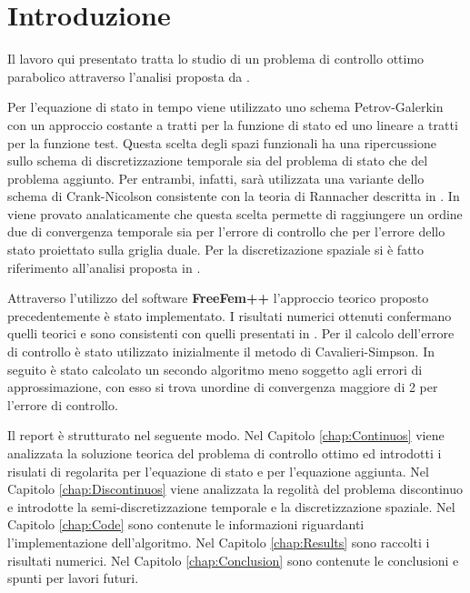\chapter{Introduzione}

Il lavoro qui presentato tratta lo studio di un problema di controllo ottimo parabolico attraverso l'analisi proposta da \cite{MAIN}.
\par\medskip
Per l'equazione di stato in tempo viene utilizzato uno schema Petrov-Galerkin con un approccio costante a tratti per la funzione di stato ed uno lineare a tratti per la funzione test. Questa scelta degli spazi funzionali ha una ripercussione sullo schema di discretizzazione temporale sia del problema di stato che del problema aggiunto. Per entrambi, infatti, sarà utilizzata una variante dello schema di Crank-Nicolson consistente con la teoria di Rannacher descritta in \cite{Ran84}.
In \cite{MAIN} viene provato analaticamente che questa scelta permette di raggiungere un ordine due di convergenza temporale sia per l'errore di controllo che per l'errore dello stato proiettato sulla griglia duale.
Per la discretizazione spaziale si è fatto riferimento all'analisi proposta in \cite{MV11}.
\par\medskip
Attraverso l'utilizzo del software \textbf{FreeFem++} l'approccio teorico proposto precedentemente è stato implementato. I risultati numerici ottenuti confermano quelli teorici e sono consistenti con quelli presentati in \cite{MAIN}. Per il calcolo dell'errore di controllo è stato utilizzato inizialmente il metodo di Cavalieri-Simpson. In seguito è stato calcolato un secondo algoritmo meno soggetto agli errori di approssimazione, con esso si trova unordine di convergenza maggiore di 2 per l'errore di controllo.
\par\medskip
Il report è strutturato nel seguente modo. Nel Capitolo \ref{chap:Continuos} viene analizzata la soluzione teorica del problema di controllo ottimo ed introdotti i risulati di regolarita per l'equazione di stato e per l'equazione aggiunta. Nel Capitolo \ref{chap:Discontinuos} viene analizzata la regolità del problema discontinuo e introdotte la semi-discretizzazione temporale e la discretizzazione spaziale. Nel Capitolo \ref{chap:Code} sono contenute le informazioni riguardanti l'implementazione dell'algoritmo. Nel Capitolo \ref{chap:Results} sono raccolti i risultati numerici. Nel Capitolo \ref{chap:Conclusion} sono contenute le conclusioni e spunti per lavori futuri.